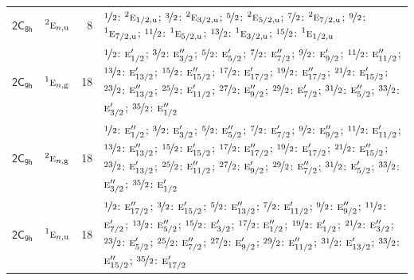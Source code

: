 \documentclass[10pt,a4paper]{article}
\numberwithin{equation}{section}
\newcommand{\grp}[1]{\mathsf{#1}}
\newcommand{\irr}[1]{\text{\normalfont\scshape #1}}
\newcommand{\conjpair}[1]{{}^{#1}}
\newcommand{\ptag}[1]{\mathrm{#1}}
\newlength{\fillwidth}\newlength{\cellwidth}\newlength{\colwidth}
\begin{document}
{\begin{longtable}{@{}llr>{\RaggedRight\arraybackslash}p{\fillwidth}@{}}
\href{2C8h.pdf}{$\grp{2C_{8h}}$} & $\conjpair{2}\irr{e}_{n,\ptag{u}}$ & 8 & $\nicefrac{1}{2}$: $\conjpair{2}\irr{e}_{1/2,\ptag{u}}$; $\nicefrac{3}{2}$: $\conjpair{2}\irr{e}_{3/2,\ptag{u}}$; $\nicefrac{5}{2}$: $\conjpair{2}\irr{e}_{5/2,\ptag{u}}$; $\nicefrac{7}{2}$: $\conjpair{2}\irr{e}_{7/2,\ptag{u}}$; $\nicefrac{9}{2}$: $\conjpair{1}\irr{e}_{7/2,\ptag{u}}$; $\nicefrac{11}{2}$: $\conjpair{1}\irr{e}_{5/2,\ptag{u}}$; $\nicefrac{13}{2}$: $\conjpair{1}\irr{e}_{3/2,\ptag{u}}$; $\nicefrac{15}{2}$: $\conjpair{1}\irr{e}_{1/2,\ptag{u}}$\\
\href{2C9h.pdf}{$\grp{2C_{9h}}$} & $\conjpair{1}\irr{e}_{n,\ptag{g}}$ & 18 & $\nicefrac{1}{2}$: $\irr{e}_{1/2}'$; $\nicefrac{3}{2}$: $\irr{e}_{3/2}''$; $\nicefrac{5}{2}$: $\irr{e}_{5/2}'$; $\nicefrac{7}{2}$: $\irr{e}_{7/2}''$; $\nicefrac{9}{2}$: $\irr{e}_{9/2}'$; $\nicefrac{11}{2}$: $\irr{e}_{11/2}''$; $\nicefrac{13}{2}$: $\irr{e}_{13/2}'$; $\nicefrac{15}{2}$: $\irr{e}_{15/2}''$; $\nicefrac{17}{2}$: $\irr{e}_{17/2}'$; $\nicefrac{19}{2}$: $\irr{e}_{17/2}''$; $\nicefrac{21}{2}$: $\irr{e}_{15/2}'$; $\nicefrac{23}{2}$: $\irr{e}_{13/2}''$; $\nicefrac{25}{2}$: $\irr{e}_{11/2}'$; $\nicefrac{27}{2}$: $\irr{e}_{9/2}''$; $\nicefrac{29}{2}$: $\irr{e}_{7/2}'$; $\nicefrac{31}{2}$: $\irr{e}_{5/2}''$; $\nicefrac{33}{2}$: $\irr{e}_{3/2}'$; $\nicefrac{35}{2}$: $\irr{e}_{1/2}''$\\
\href{2C9h.pdf}{$\grp{2C_{9h}}$} & $\conjpair{2}\irr{e}_{n,\ptag{g}}$ & 18 & $\nicefrac{1}{2}$: $\irr{e}_{1/2}''$; $\nicefrac{3}{2}$: $\irr{e}_{3/2}'$; $\nicefrac{5}{2}$: $\irr{e}_{5/2}''$; $\nicefrac{7}{2}$: $\irr{e}_{7/2}'$; $\nicefrac{9}{2}$: $\irr{e}_{9/2}''$; $\nicefrac{11}{2}$: $\irr{e}_{11/2}'$; $\nicefrac{13}{2}$: $\irr{e}_{13/2}''$; $\nicefrac{15}{2}$: $\irr{e}_{15/2}'$; $\nicefrac{17}{2}$: $\irr{e}_{17/2}''$; $\nicefrac{19}{2}$: $\irr{e}_{17/2}'$; $\nicefrac{21}{2}$: $\irr{e}_{15/2}''$; $\nicefrac{23}{2}$: $\irr{e}_{13/2}'$; $\nicefrac{25}{2}$: $\irr{e}_{11/2}''$; $\nicefrac{27}{2}$: $\irr{e}_{9/2}'$; $\nicefrac{29}{2}$: $\irr{e}_{7/2}''$; $\nicefrac{31}{2}$: $\irr{e}_{5/2}'$; $\nicefrac{33}{2}$: $\irr{e}_{3/2}''$; $\nicefrac{35}{2}$: $\irr{e}_{1/2}'$\\
\href{2C9h.pdf}{$\grp{2C_{9h}}$} & $\conjpair{1}\irr{e}_{n,\ptag{u}}$ & 18 & $\nicefrac{1}{2}$: $\irr{e}_{17/2}''$; $\nicefrac{3}{2}$: $\irr{e}_{15/2}'$; $\nicefrac{5}{2}$: $\irr{e}_{13/2}''$; $\nicefrac{7}{2}$: $\irr{e}_{11/2}'$; $\nicefrac{9}{2}$: $\irr{e}_{9/2}''$; $\nicefrac{11}{2}$: $\irr{e}_{7/2}'$; $\nicefrac{13}{2}$: $\irr{e}_{5/2}''$; $\nicefrac{15}{2}$: $\irr{e}_{3/2}'$; $\nicefrac{17}{2}$: $\irr{e}_{1/2}''$; $\nicefrac{19}{2}$: $\irr{e}_{1/2}'$; $\nicefrac{21}{2}$: $\irr{e}_{3/2}''$; $\nicefrac{23}{2}$: $\irr{e}_{5/2}'$; $\nicefrac{25}{2}$: $\irr{e}_{7/2}''$; $\nicefrac{27}{2}$: $\irr{e}_{9/2}'$; $\nicefrac{29}{2}$: $\irr{e}_{11/2}''$; $\nicefrac{31}{2}$: $\irr{e}_{13/2}'$; $\nicefrac{33}{2}$: $\irr{e}_{15/2}''$; $\nicefrac{35}{2}$: $\irr{e}_{17/2}'$\\

\end{longtable}}
\end{document}
